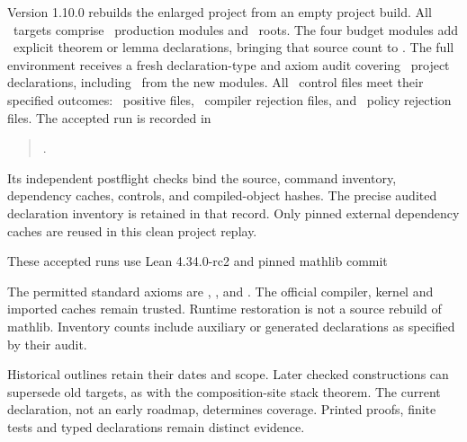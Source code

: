 Version 1.10.0 rebuilds the enlarged project from an empty project build. All \EditionBudgetTargets\ targets comprise \EditionBudgetModules\ production modules and \EditionBudgetRoots\ roots. The four budget modules add \EditionBudgetNewTheorems\ explicit theorem or lemma declarations, bringing that source count to \EditionBudgetTheorems. The full environment receives a fresh declaration-type and axiom audit covering \EditionBudgetDeclarations\ project declarations, including \EditionBudgetNewDeclarations\ from the new modules. All \EditionBudgetControls\ control files meet their specified outcomes: \EditionBudgetPositiveFiles\ positive files, \EditionBudgetCompilerNegativeFiles\ compiler rejection files, and \EditionBudgetPolicyNegativeFiles\ policy rejection files. The accepted run is recorded in
\begin{quote}\small{}.\end{quote}
Its independent postflight checks bind the source, command inventory, dependency caches, controls, and compiled-object hashes. The precise audited declaration inventory is retained in that record. Only pinned external dependency caches are reused in this clean project replay.

These accepted runs use Lean 4.34.0-rc2 and pinned mathlib commit
\begin{quote}\small{}\end{quote}
The permitted standard axioms are , , and . The official compiler, kernel and imported caches remain trusted. Runtime restoration is not a source rebuild of mathlib. Inventory counts include auxiliary or generated declarations as specified by their audit.

Historical outlines retain their dates and scope. Later checked constructions can supersede old targets, as with the composition-site stack theorem. The current declaration, not an early roadmap, determines coverage. Printed proofs, finite tests and typed declarations remain distinct evidence.
